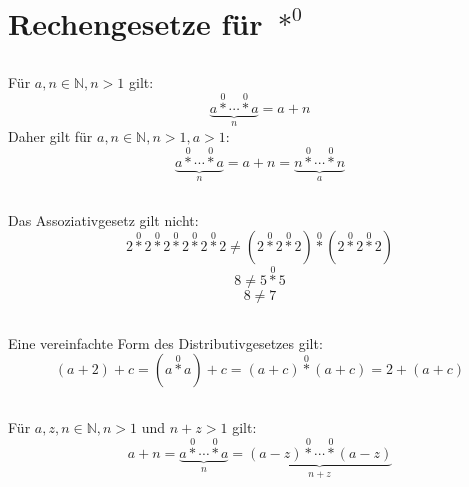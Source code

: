 \documentclass{article}
\begin{document}
\section{Rechengesetze f\"ur $\operatorname*{\ast}^0$\newline}

\subsection{}
F\"ur $a, n \in \mathbb{N}, n > 1$ gilt:
\[ \underbrace{a \operatorname*{\ast}^0 \dotsb \operatorname*{\ast}^0 a}_n = a+n \]
Daher gilt f\"ur $a, n \in \mathbb{N}, n > 1, a > 1$:
\[ \underbrace{a \operatorname*{\ast}^0 \dotsb \operatorname*{\ast}^0 a}_n =
   a+n = \underbrace{n \operatorname*{\ast}^0 \dotsb \operatorname*{\ast}^0 n}_a \]
\subsection{}
	Das Assoziativgesetz gilt nicht:
\[ 2 \operatorname*{\ast}^0 2 \operatorname*{\ast}^0 2 \operatorname*{\ast}^0 2 \operatorname*{\ast}^0 2 \operatorname*{\ast}^0 2 \neq
   \left(2 \operatorname*{\ast}^0 2 \operatorname*{\ast}^0 2\right) \operatorname*{\ast}^0 \left(2 \operatorname*{\ast}^0 2 \operatorname*{\ast}^0 2\right) \]
\[ 8 \neq 5 \operatorname*{\ast}^0 5 \]
\[ 8 \neq 7 \]
\subsection{}
	Eine vereinfachte Form des Distributivgesetzes gilt:
\[ \left(a + 2\right) + c = \left(a\operatorname*{\ast}^0a\right) + c = \left(a+c\right)\operatorname*{\ast}^0\left(a+c\right) = 2 + \left(a + c\right) \]
\subsection{}
F\"ur $a, z, n \in \mathbb{N}, n > 1$ und $n+z > 1$ gilt:
\[ a + n = \underbrace{a \operatorname*{\ast}^0 \dotsb \operatorname*{\ast}^0 a}_n =
   \underbrace{\left(a - z\right) \operatorname*{\ast}^0 \dotsb \operatorname*{\ast}^0 \left(a - z\right)}_{n+z} \]
\end{document}
